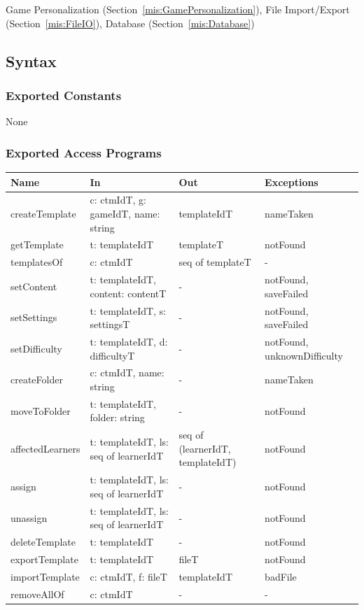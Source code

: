 \documentclass[12pt, titlepage]{article}
\newcommand{\Mref}[1]{Section~\ref{#1}}
\begin{document}
Game Personalization (\Mref{mis:GamePersonalization}), File
Import/Export (\Mref{mis:FileIO}), Database (\Mref{mis:Database})

\subsection{Syntax}

\subsubsection{Exported Constants}

None

\subsubsection{Exported Access Programs}

\begin{center}
\small
\begin{tabular}{p{3.3cm} p{4.7cm} p{2.6cm} p{2.8cm}}
\hline
\textbf{Name} & \textbf{In} & \textbf{Out} & \textbf{Exceptions} \\
\hline
createTemplate & c: ctmIdT, g: gameIdT, name: string & templateIdT & nameTaken \\
getTemplate & t: templateIdT & templateT & notFound \\
templatesOf & c: ctmIdT & seq of templateT & - \\
setContent & t: templateIdT, content: contentT & - & notFound, saveFailed \\
setSettings & t: templateIdT, s: settingsT & - & notFound, saveFailed \\
setDifficulty & t: templateIdT, d: difficultyT & - & notFound, unknownDifficulty \\
createFolder & c: ctmIdT, name: string & - & nameTaken \\
moveToFolder & t: templateIdT, folder: string & - & notFound \\
affectedLearners & t: templateIdT, ls: seq of learnerIdT & seq of (learnerIdT, templateIdT) & notFound \\
assign & t: templateIdT, ls: seq of learnerIdT & - & notFound \\
unassign & t: templateIdT, ls: seq of learnerIdT & - & notFound \\
deleteTemplate & t: templateIdT & - & notFound \\
exportTemplate & t: templateIdT & fileT & notFound \\
importTemplate & c: ctmIdT, f: fileT & templateIdT & badFile \\
removeAllOf & c: ctmIdT & - & - \\
\hline
\end{tabular}
\end{center}
\end{document}

